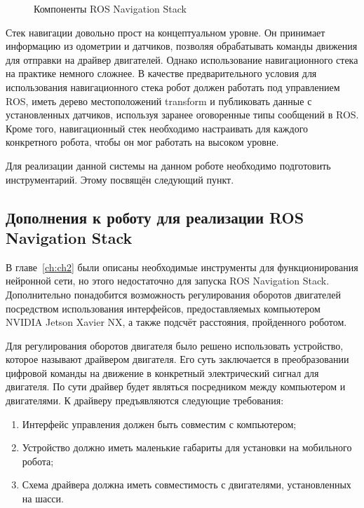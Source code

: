 \begin{figure}[ht]
    \caption{Компоненты ROS Navigation Stack}\label{fig:nav-stack}
\end{figure}

Стек навигации довольно прост на концептуальном уровне. Он принимает информацию из одометрии и датчиков, позволяя обрабатывать команды движения для отправки на драйвер двигателей. Однако использование навигационного стека на практике немного сложнее. В качестве предварительного условия для использования навигационного стека робот должен работать под управлением ROS, иметь дерево местоположений transform и публиковать данные с установленных датчиков, используя заранее оговоренные типы сообщений в ROS. Кроме того, навигационный стек необходимо настраивать для каждого конкретного робота, чтобы он мог работать на высоком уровне.

Для реализации данной системы на данном роботе необходимо подготовить инструментарий. Этому посвящён следующий пункт.

\subsection{Дополнения к роботу для реализации ROS Navigation Stack}
В главе~\cref{ch:ch2} были описаны необходимые инструменты для функционирования нейронной сети, но этого недостаточно для запуска ROS Navigation Stack. Дополнительно понадобится возможность регулирования оборотов двигателей посредством использования интерфейсов, предоставляемых компьютером NVIDIA Jetson Xavier NX, а также подсчёт расстояния, пройденного роботом. 

Для регулирования оборотов двигателя было решено использовать устройство, которое называют драйвером двигателя. Его суть заключается в преобразовании цифровой команды на движение в конкретный электрический сигнал для двигателя. По сути драйвер будет являться посредником между компьютером и двигателями. К драйверу предъявляются следующие требования:

\begin{enumerate}[beginpenalty=10000] %
  \item Интерфейс управления должен быть совместим с компьютером;
  \item Устройство должно иметь маленькие габариты для установки на мобильного робота;
  \item Схема драйвера должна иметь совместимость с двигателями, установленных на шасси.
\end{enumerate}

